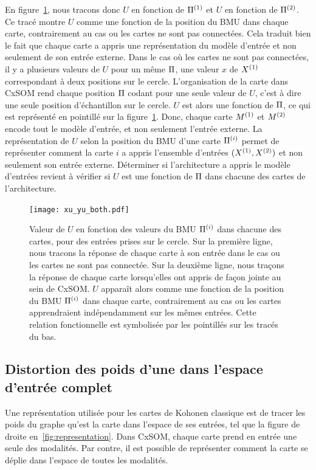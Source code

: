 En figure~\ref{fig:piu}, nous tracons donc $U$ en fonction de $\Pi^{({1})}$ et $U$ en fonction de $\Pi^{({2})}$.
Ce tracé montre $U$ comme une fonction de la position du BMU dans chaque carte, contrairement au cas ou les cartes ne sont pas connectées. Cela traduit bien le fait que chaque carte a appris une représentation du modèle d'entrée et non seulement de son entrée externe.
Dans le cas où les cartes ne sont pas connectées, il y a plusieurs valeurs de $U$ pour un même $\Pi$, une valeur $x$ de $X^{({1})}$ correspondant à deux positions sur le cercle.
L'organisation de la carte dans CxSOM rend chaque position $\Pi$ codant pour une seule valeur de $U$, c'est à dire une seule position d'échantillon sur le cercle. $U$ est alors une fonction de $\Pi$, ce qui est représenté en pointillé sur la figure~\ref{fig:piu}. Donc, chaque carte $M^{({1})}$ et $M^{({2})}$ encode tout le modèle d'entrée, et non seulement l'entrée externe.
La représentation de $U$ selon la position du BMU d'une carte $\Pi^{({i})}$ permet de représenter comment la carte $i$ a appris l'ensemble d'entrées $(X^{({1})},X^{({2})})$ et non seulement son entrée externe. Déterminer si l'architecture a appris le modèle d'entrées revient à vérifier si $U$ est une fonction de $\Pi$ dans chacune des cartes de l'architecture.
 
\begin{figure}
\centering
\texttt{[image: xu\_yu\_both.pdf]}
\caption{Valeur de $U$ en fonction des valeurs du BMU $\Pi^{({i})}$ dans chacune des cartes, pour des entrées prises sur le cercle. Sur la première ligne, nous tracons la réponse de chaque carte à son entrée dans le cas ou les cartes ne sont pas connectée. Sur la deuxième ligne, nous traçons la réponse de chaque carte lorsqu'elles ont appris de façon jointe au sein de CxSOM.
$U$ apparaît alors comme une fonction de la position du BMU $\Pi^{({i})}$ dans chaque carte, contrairement au cas ou les cartes apprendraient indépendamment sur les mêmes entrées. Cette relation fonctionnelle est symbolisée par les pointillés sur les tracés du bas.}
\label{fig:piu}
\end{figure}


\subsection{Distortion des poids d'une dans l'espace d'entrée complet}

Une représentation utilisée pour les cartes de Kohonen classique est de tracer les poids du graphe qu'est la carte dans l'espace de ses entrées, tel que la figure de droite en~\ref{fig:representation}. Dans CxSOM, chaque carte prend en entrée une seule des modalités. Par contre, il est possible de représenter comment la carte se déplie dans l'espace de toutes les modalités.

